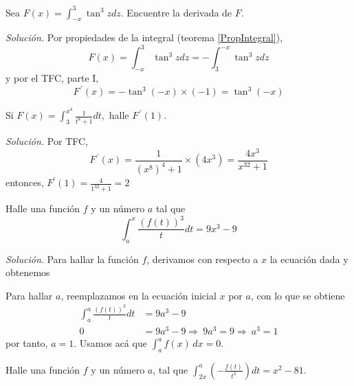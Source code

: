 \begin{ejemplo}
\textnormal{Sea \textit{$F\left( x\right) =\displaystyle\int_{-x}^{3}\tan ^{3}zdz$}. Encuentre la derivada de \textit{$F$}.}
\end{ejemplo}


\textit{Solución.} Por propiedades de la integral (teorema \ref{PropIntegral}),
\[
F\left( x\right) =\int_{-x}^{3}\tan ^{3}zdz=-\int_{3}^{-x}\tan
^{3}zdz
\]
y por el TFC, parte I,
\[
F^{\, \prime}\left( x\right) =-\tan ^{3}\left( -x\right) \times \left( -1\right)
=\tan ^{3}\left( -x\right) 
\]

\begin{ejemplo} \textnormal{Si \textit{$F\left( x\right) =\displaystyle\int_{3}^{x^{4}}\frac{1}{t^{8}+1}dt,$}} \textnormal{halle} \textit{$F^{\, \prime}\left( 1\right) .$}
\end{ejemplo}

\textit{Solución.} Por TFC,
\[
F^{\, \prime}\left( x\right)=\frac{1}{(x^8)^4+1}\times(4x^3)=\frac{ 4x^{3}}{x^{32}+1}
\]
entonces, $F^{\prime}\left( 1\right) =\frac{4}{1^{32}+1}= 2$

\begin{ejemplo}
\textnormal{Halle una función \textit{$f$} y un número \textit{$a$} tal que}
\[
\int_{a}^{x}\frac{\left( f\left( t\right) \right) ^{3}}{t}dt=9x^{3}-9
\]
\end{ejemplo}

\textit{Solución}. Para hallar la función $f$, derivamos con respecto a $x$ la ecuación dada y obtenemos




Para hallar $a$, reemplazamos en la ecuación inicial $x$ por $a$, con lo que se obtiene
\begin{align*}
\int_{a}^{a}\frac{\left( f\left( t\right) \right) ^{3}}{t}dt&=9a^{3}-9\\
0&=9a^{3}-9\Rightarrow\ 9a^{3}=9\Rightarrow\ a^{3}=1
\end{align*}
por tanto, $a=1$. Usamos acá que $\int_a^af(x)\,dx=0$.

\begin{ejemplo}
\textnormal{Halle una función \textit{$f$} y un número \textit{$a$}, tal que} {\small $\displaystyle\int_{2x}^{a}\left(-\frac{f\left( t\right) }{t^{2}}\right)dt=x^{2}-81.$
}
\end{ejemplo}

